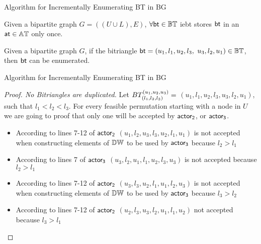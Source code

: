 \begin{frame}[fragile]{Algorithm for Incrementally Enumerating BT in BG}
  \begin{theorem}[Uniqueness] 
    Given a bipartite graph $G = ((U\cup L),E)$, $\forall \mathsf{bt}\in\mathbb{BT}$  \acrshort{iebt} stores $\mathsf{bt}$ in an $\mathsf{at}\in \mathbb{AT}$ only once.
  \end{theorem}
  \vspace{1.5cm}
  \begin{theorem}
    Given a bipartite graph $G$, if the bitriangle $\mathsf{bt} = (u_1,l_1,u_2,l_3,$ $u_3,l_2,u_1)\in \mathbb{BT}$, then $\mathsf{bt}$  can be enumerated.
  \end{theorem}  
\end{frame} 

\iffalse
\begin{frame}[fragile]{Algorithm for Incrementally Enumerating BT in BG}
  \begin{proof}[Proof. No Bitriangles are duplicated]   
  Let $BT_{(l_1, l_2,l_3)}^{(u_1, u_2, u_3)} =$  $(u_1,l_1,u_2,l_3,u_3,l_2,u_1)$, such that $l_1 < l_2 <l_3$. For every feasible permutation  starting with a node in $U$ we are going to proof that only one will be accepted by $\mathsf{actor_2}$, or $\mathsf{actor_3}$.  
  \begin{itemize}
        \item According to lines 7-12 of $\mathsf{actor_2}$ $(u_1,l_2,u_3,l_3,u_2,l_1,u_1)$ is  not accepted  when constructing elements of $\mathbb{DW}$ to be used by $\mathsf{actor_3}$  because $l_2 > l_1$ 
        \item According to lines 7 of $\mathsf{actor_3}$ $(u_3,l_2,u_1,l_1,u_2,l_3,u_3)$ is not accepted because $l_2 > l_1$
        \item According to lines 7-12 of $\mathsf{actor_2}$ $(u_3,l_3,u_2,l_1,u_1,l_2,u_3)$ is  not accepted  when constructing elements of $\mathbb{DW}$ to be used by $\mathsf{actor_3}$  because  $l_3 > l_2$
        \item According to lines 7-12 of $\mathsf{actor_2}$ $(u_2,l_3,u_3,l_2,u_1,l_1,u_2)$ not accepted because $l_3 > l_1 $
  \end{itemize}
  \end{proof}  
\end{frame}

